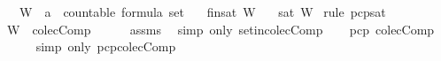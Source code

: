 \begin{isabellebody}
\ \ \ W\ {\isacharcolon}{\isacharcolon}\ {\isachardoublequoteopen}{\isacharprime}a\ {\isacharcolon}{\isacharcolon}\ countable\ formula\ set{\isachardoublequoteclose}\isanewline
\ \ \ {\isachardoublequoteopen}fin{\isacharunderscore}sat\ W{\isachardoublequoteclose}\isanewline
\ \ \ {\isachardoublequoteopen}sat\ W{\isachardoublequoteclose}\isanewline
%
\isadelimproof
%
\endisadelimproof
%
\isatagproof
{}\isamarkupfalse%
\ {\isacharparenleft}rule\ pcp{\isacharunderscore}sat{\isacharparenright}\isanewline
\ \ \isamarkupfalse%
\ {\isachardoublequoteopen}W\ {\isasymin}\ colecComp{\isachardoublequoteclose}\isanewline
\ \ \ \ \isamarkupfalse%
\ assms\ \isamarkupfalse%
\ {\isacharparenleft}simp\ only{\isacharcolon}\ set{\isacharunderscore}in{\isacharunderscore}colecComp{\isacharparenright}\isanewline
\ \ \isamarkupfalse%
\ {\isachardoublequoteopen}pcp\ colecComp{\isachardoublequoteclose}\isanewline
\ \ \ \ \isamarkupfalse%
\ {\isacharparenleft}simp\ only{\isacharcolon}\ pcp{\isacharunderscore}colecComp{\isacharparenright}\isanewline
{}\isamarkupfalse%
\isanewline
%
\endisatagproof
{\isafoldproof}%
%
\isadelimproof
%
\endisadelimproof
%
\isadelimtheory
%
\endisadelimtheory
%
\isatagtheory
%
\endisatagtheory
{\isafoldtheory}%
%
\isadelimtheory
%
\endisadelimtheory
%
\end{isabellebody}%
\endinput
